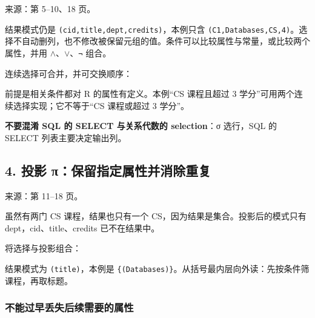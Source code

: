 
来源：第 5--10、18 页。


结果模式仍是 \texttt{(\allowbreak{}cid,\allowbreak{}title,\allowbreak{}dept,\allowbreak{}credits)\allowbreak{}}，本例只含 \texttt{(\allowbreak{}C1,\allowbreak{}Databases,\allowbreak{}CS,\allowbreak{}4)\allowbreak{}}。选择不自动删列，也不修改被保留元组的值。条件可以比较属性与常量，或比较两个属性，并用 \(\land \)、\(\lor \)、\texttt{¬} 组合。

连续选择可合并，并可交换顺序：


前提是相关条件都对 R 的属性有定义。本例``CS 课程且超过 3 学分''可用两个连续选择实现；它不等于``CS 课程或超过 3 学分''。

\textbf{不要混淆 SQL 的 SELECT 与关系代数的 selection}：σ 选行，SQL 的 SELECT 列表主要决定输出列。

\subsection{4. 投影 π：保留指定属性并消除重复}\label{05_relational_algebra_zh-ux6295ux5f71-ux3c0ux4fddux7559ux6307ux5b9aux5c5eux6027ux5e76ux6d88ux9664ux91cdux590d}

来源：第 11--18 页。


虽然有两门 CS 课程，结果也只有一个 CS，因为结果是集合。投影后的模式只有 dept，cid、title、credits 已不在结果中。

将选择与投影组合：


结果模式为 \texttt{(\allowbreak{}title)\allowbreak{}}，本例是 \texttt{\{(Databases)\}}。从括号最内层向外读：先按条件筛课程，再取标题。

\subsubsection{不能过早丢失后续需要的属性}\label{05_relational_algebra_zh-ux4e0dux80fdux8fc7ux65e9ux4e22ux5931ux540eux7eedux9700ux8981ux7684ux5c5eux6027}

